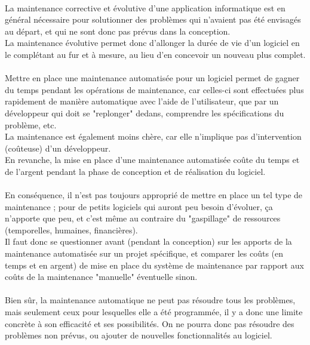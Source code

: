 \documentclass[a4paper]{article}
\begin{document}
\begin{large}

\paragraph*{}
La maintenance corrective et évolutive d'une application informatique est en général nécessaire pour solutionner des problèmes qui n'avaient pas été envisagés au départ, et qui ne sont donc pas prévus dans la conception. \\
La maintenance évolutive permet donc d'allonger la durée de vie d'un logiciel en le complétant au fur et à mesure, au lieu d'en concevoir un nouveau plus complet. 

\paragraph*{}
Mettre en place une maintenance automatisée pour un logiciel permet de gagner du temps pendant les opérations de maintenance, car celles-ci sont effectuées plus rapidement de manière automatique avec l'aide de l'utilisateur, que par un développeur qui doit se "replonger" dedans, comprendre les spécifications du problème, etc. \\
La maintenance est également moins chère, car elle n'implique pas d'intervention (coûteuse) d'un développeur. \\
En revanche, la mise en place d'une maintenance automatisée coûte du temps et de l'argent pendant la phase de conception et de réalisation du logiciel. 

\paragraph*{}
En conséquence, il n'est pas toujours approprié de mettre en place un tel type de maintenance ; pour de petits logiciels qui auront peu besoin d'évoluer, ça n'apporte que peu, et c'est même au contraire du "gaspillage" de ressources (temporelles, humaines, financières). \\
Il faut donc se questionner avant (pendant la conception) sur les apports de la maintenance automatisée sur un projet spécifique, et comparer les coûts (en temps et en argent) de mise en place du système de maintenance par rapport aux coûts de la maintenance "manuelle" éventuelle sinon. 

\paragraph*{}
Bien sûr, la maintenance automatique ne peut pas résoudre tous les problèmes, mais seulement ceux pour lesquelles elle a été programmée, il y a donc une limite concrète à son efficacité et ses possibilités. On ne pourra donc pas résoudre des problèmes non prévus, ou ajouter de nouvelles fonctionnalités au logiciel. 


\end{large}
\end{document}
